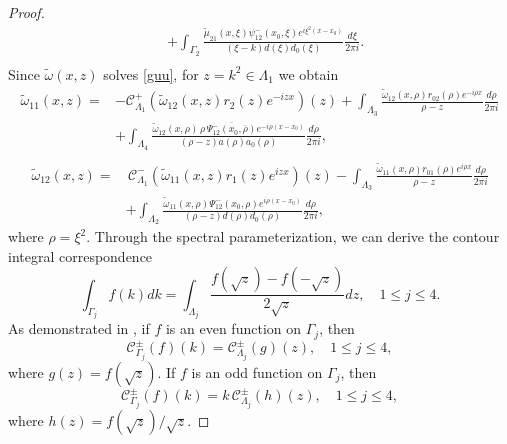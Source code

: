 \documentclass[preprint,compress,12pt]{elsarticle}
\numberwithin{equation}{section}
\begin{document}
\begin{proof}
\begin{equation}
\begin{aligned}
&+\int_{\Gamma_{2}}\frac{\tilde{\mu}_{21}(x,\xi)\psi_{12}^{-}(x_{0},\xi)e^{i\xi^{2}(x-x_{0})}}{(\xi-k)d(\xi)d_{0}(\xi)}\frac{d\xi}{2\pi i}.\\
\end{aligned}
\end{equation}
Since $\tilde{\omega}(x,z)$ solves \eqref{guu}, for $z=k^{2}\in\Lambda_{1}$ we obtain
\begin{equation}\label{nu11}
\begin{aligned}
\tilde{\omega}_{11}(x,z)=&-\mathcal{C}_{\Lambda_{1}}^{+}\left(\tilde{\omega}_{12}(x,z)r_{2}(z)e^{-izx}\right)(z)+\int_{\Lambda_{3}}\frac{\tilde{\omega}_{12}(x,\rho)r_{02}(\rho)e^{-i\rho x}}{\rho-z}\frac{d\rho}{2\pi i}\nonumber\\
&+\int_{\Lambda_{4}}\frac{\tilde{\omega}_{12}(x,\rho)\,\rho\, \overline{\Psi_{12}^{-}(x_{0},\overline{\rho})} e^{-i\rho (x-x_{0})}}{(\rho-z)a(\rho)a_{0}(\rho)}\frac{d\rho}{2\pi i},\\
\end{aligned}
\end{equation}
\begin{equation}\label{nu12}
\begin{aligned}
\tilde{\omega}_{12}(x,z)=&\,\mathcal{C}_{\Lambda_{1}}^{-}\left(\tilde{\omega}_{11}(x,z)r_{1}(z)e^{izx}\right)(z)-\int_{\Lambda_{3}}\frac{\tilde{\omega}_{11}(x,\rho)r_{01}(\rho)e^{i\rho x}}{\rho-z}\frac{d\rho}{2\pi i}\\
&+\int_{\Lambda_{2}}\frac{\tilde{\omega}_{11}(x,\rho) \Psi_{12}^{-}(x_{0},\rho) e^{i\rho (x-x_{0})}}{(\rho-z)d(\rho)d_{0}(\rho)}\frac{d\rho}{2\pi i},
\end{aligned}
\end{equation}
where $\rho=\xi^{2}$. Through the spectral parameterization, we can derive the contour integral correspondence
\begin{equation}\label{1tra}
\int_{\Gamma_{j}}f(k) dk=\int_{\Lambda_{j}}\frac{ f(\sqrt{z})-f(-\sqrt{z})}{2\sqrt{z}}dz, \quad 1\leq j\leq4.
\end{equation}
As demonstrated in \cite{Liu16}, if $f$ is an even function on $\Gamma_{j}$, then
\begin{equation}\label{2even}
\mathcal{C}_{\Gamma_{j}}^{\pm}(f)(k)=\mathcal{C}_{\Lambda_{j}}^{\pm}(g)(z),\quad 1\leq j\leq4,
\end{equation}
where $g(z)=f(\sqrt{z})$.
If $f$ is an odd function on $\Gamma_{j}$, then
\begin{equation}\label{3odd}
\mathcal{C}_{\Gamma_{j}}^{\pm}(f)(k)=k\, \mathcal{C}_{\Lambda_{j}}^{\pm}(h)(z),\quad 1\leq j\leq4,
\end{equation}
where $h(z)=f(\sqrt{z})/\sqrt{z}$.



\end{proof}
\end{document}
